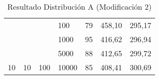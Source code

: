 \documentclass{article}
\begin{document}
\begin{table}[h]
\begin{tabular}{lllllll}
			&                                                &                                                                       &                                                                           &                                                                              &                                                                                     &                                                                                       \\ \hline
			\multicolumn{1}{|l|}{}                                                 & \multicolumn{1}{l|}{}                          & \multicolumn{1}{l|}{}                                                 & \multicolumn{1}{l|}{100}                                                  & \multicolumn{1}{l|}{79}                                                      & \multicolumn{1}{l|}{458,10}                                                         & \multicolumn{1}{l|}{295,17}                                                           \\ \cline{4-7} 
			\multicolumn{1}{|l|}{}                                                 & \multicolumn{1}{l|}{}                          & \multicolumn{1}{l|}{}                                                 & \multicolumn{1}{l|}{1000}                                                 & \multicolumn{1}{l|}{95}                                                      & \multicolumn{1}{l|}{416,62}                                                         & \multicolumn{1}{l|}{296,94}                                                           \\ \cline{4-7} 
			\multicolumn{1}{|l|}{}                                                 & \multicolumn{1}{l|}{}                          & \multicolumn{1}{l|}{}                                                 & \multicolumn{1}{l|}{5000}                                                 & \multicolumn{1}{l|}{88}                                                      & \multicolumn{1}{l|}{412,65}                                                         & \multicolumn{1}{l|}{299,72}                                                           \\ \cline{4-7} 
			\multicolumn{1}{|l|}{\multirow{-4}{*}{10}}                             & \multicolumn{1}{l|}{\multirow{-4}{*}{10}}      & \multicolumn{1}{l|}{\multirow{-4}{*}{100}}                            & \multicolumn{1}{l|}{10000}                                                & \multicolumn{1}{l|}{85}                                                      & \multicolumn{1}{l|}{408,41}                                                         & \multicolumn{1}{l|}{300,69}                                                           \\ \hline
		\end{tabular}
	\caption{Resultado Distribución A (Modificación 2)}
	\end{table}
\end{document}
